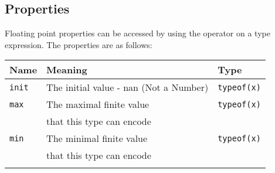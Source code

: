 \subsection{Properties}
\label{sec:org52a5d6e}

Floating point properties can be accessed by using the \token{::} operator on a
type expression. The properties are as follows:

\begin{center}
  \vspace{-5pt}
  \begin{adjustbox}{max width=1.01\linewidth}
    \begin{threeparttable}
      \begin{tabular}{|l|ll|}
        \hline
        Name & Meaning & Type\\[0pt]
        \hline
        \hline
        \texttt{init} & The initial value - nan (Not a Number) & \texttt{typeof(x)}\\[0pt]
        \Xhline{0.001pt}
        \texttt{max} & The maximal finite value & \texttt{typeof(x)}\\
        & that this type can encode & \\[0pt]
        \Xhline{0.001pt}

        \texttt{min} & The minimal finite value & \texttt{typeof(x)}\\
        & that this type can encode & \\[0pt]
        \Xhline{0.001pt}


\end{tabular}
\end{threeparttable}
\end{adjustbox}
\end{center}
